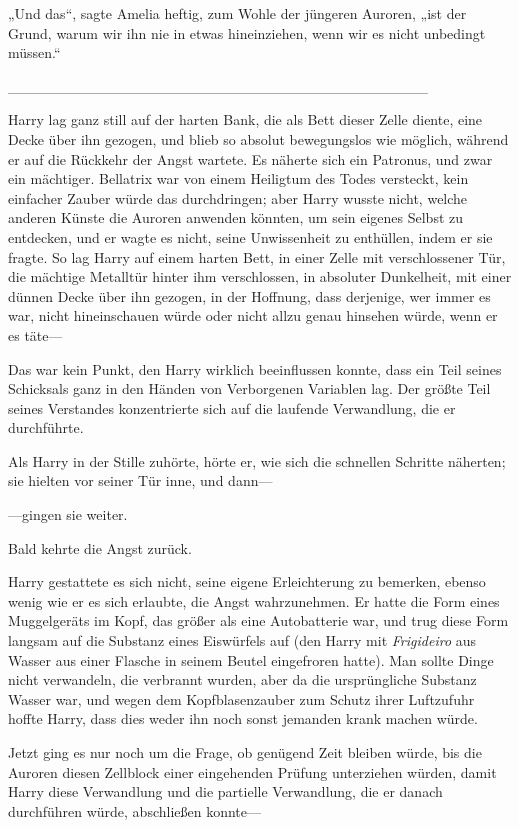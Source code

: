{„Und das“, sagte Amelia heftig, zum Wohle der jüngeren Auroren, „ist der Grund, warum wir ihn nie in etwas hineinziehen, wenn wir es nicht unbedingt müssen.“

\_\_\_\_\_\_\_\_\_\_\_\_\_\_\_\_\_\_\_\_\_\_\_\_\_\_\_\_\_\_\_\_\_\_\_\_\_\_\_\_

Harry lag ganz still auf der harten Bank, die als Bett dieser Zelle diente, eine Decke über ihn gezogen, und blieb so absolut bewegungslos wie möglich, während er auf die Rückkehr der Angst wartete. Es näherte sich ein Patronus, und zwar ein mächtiger. Bellatrix war von einem Heiligtum des Todes versteckt, kein einfacher Zauber würde das durchdringen; aber Harry wusste nicht, welche anderen Künste die Auroren anwenden könnten, um sein eigenes Selbst zu entdecken, und er wagte es nicht, seine Unwissenheit zu enthüllen, indem er sie fragte. So lag Harry auf einem harten Bett, in einer Zelle mit verschlossener Tür, die mächtige Metalltür hinter ihm verschlossen, in absoluter Dunkelheit, mit einer dünnen Decke über ihn gezogen, in der Hoffnung, dass derjenige, wer immer es war, nicht hineinschauen würde oder nicht allzu genau hinsehen würde, wenn er es täte—

Das war kein Punkt, den Harry wirklich beeinflussen konnte, dass ein Teil seines Schicksals ganz in den Händen von Verborgenen Variablen lag. Der größte Teil seines Verstandes konzentrierte sich auf die laufende Verwandlung, die er durchführte.

Als Harry in der Stille zuhörte, hörte er, wie sich die schnellen Schritte näherten; sie hielten vor seiner Tür inne, und dann—

—gingen sie weiter.

Bald kehrte die Angst zurück.

Harry gestattete es sich nicht, seine eigene Erleichterung zu bemerken, ebenso wenig wie er es sich erlaubte, die Angst wahrzunehmen. Er hatte die Form eines Muggelgeräts im Kopf, das größer als eine Autobatterie war, und trug diese Form langsam auf die Substanz eines Eiswürfels auf (den Harry mit \emph{Frigideiro} aus Wasser aus einer Flasche in seinem Beutel eingefroren hatte). Man sollte Dinge nicht verwandeln, die verbrannt wurden, aber da die ursprüngliche Substanz Wasser war, und wegen dem Kopfblasenzauber zum Schutz ihrer Luftzufuhr hoffte Harry, dass dies weder ihn noch sonst jemanden krank machen würde.

Jetzt ging es nur noch um die Frage, ob genügend Zeit bleiben würde, bis die Auroren diesen Zellblock einer eingehenden Prüfung unterziehen würden, damit Harry diese Verwandlung und die partielle Verwandlung, die er danach durchführen würde, abschließen konnte—

}
